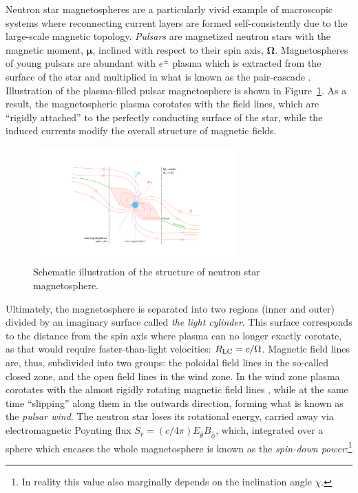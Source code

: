 Neutron star magnetospheres are a particularly vivid example of macroscopic systems where reconnecting current layers are formed self-consistently due to the large-scale magnetic topology. \emph{Pulsars} are magnetized neutron stars with the magnetic moment, $\bm{\mu}$, inclined with respect to their spin axis, $\bm{\Omega}$. Magnetospheres of young pulsars are abundant with $e^\pm$ plasma which is extracted from the surface of the star and multiplied in what is known as the pair-cascade  \citep{1969ApJ...157..869G, 1971ApJ...164..529S, 1975ApJ...196...51R}. Illustration of the plasma-filled pulsar magnetosphere is shown in Figure~\ref{fig:intro-psr}.  As a result, the magnetospheric plasma corotates with the field lines, which are ``rigidly attached'' to the perfectly conducting surface of the star, while the induced currents modify the overall structure of magnetic fields.

\begin{figure}[htb]
    \centering
    \includegraphics[width=0.7\textwidth,trim={350 150 350 150},clip]{figures/intro/pulsar_side.pdf}
    \caption{Schematic illustration of the structure of neutron star magnetosphere.}
    \label{fig:intro-psr}
\end{figure}

Ultimately, the magnetosphere is separated into two regions (inner and outer) divided by an imaginary surface called \emph{the light cylinder}. This surface corresponds to the distance from the spin axis where plasma can no longer exactly corotate, as that would require faster-than-light velocities: $R_{\rm LC} = c/\Omega$. Magnetic field lines are, thus, subdivided into two groups: the poloidal field lines in the so-called closed zone, and the open field lines in the wind zone. In the wind zone plasma corotates with the almost rigidly rotating magnetic field lines , while at the same time ``slipping'' along them in the outwards direction, forming what is known as the \emph{pulsar wind}. The neutron star loses its rotational energy, carried away via electromagnetic Poynting flux $S_{\hat{r}} = (c/4\pi) E_{\hat{\theta}}B_{\hat{\phi}}$, which, integrated over a sphere which encases the whole magnetosphere is known as the \emph{spin-down power}:\footnote{In reality this value also marginally depends on the inclination angle $\chi$.}

